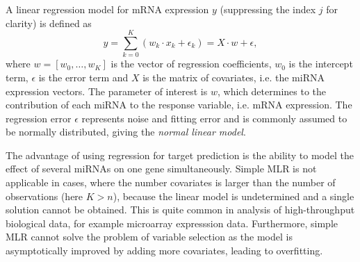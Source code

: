 A linear regression model for mRNA expression $y$ (suppressing the index $j$ for clarity) is defined as
\begin{equation}
  \label{eq:linear-regression}
	y = \sum_{k=0}^{K} (w_{k} \cdot x_k + \epsilon_{k}) =  X \cdot w + \epsilon,
\end{equation}
where $w = [w_0, \ldots, w_K]$ is the vector of regression coefficients,
$w_0$ is the intercept term, $\epsilon$ is the error term and $X$ is the
matrix of covariates, i.e. the miRNA expression vectors. The parameter of
interest is $w$, which determines to the contribution of each miRNA to the
response variable, i.e. mRNA expression. The regression error $\epsilon$
represents noise and fitting error and is commonly assumed to be normally
distributed, giving the \emph{normal linear model}.

The advantage of using regression for target prediction is the ability to
model the effect of several miRNAs on one gene simultaneously.
Simple MLR is not applicable in cases, where the number covariates is larger
than the number of observations (here $K > n$), because the linear model is
undetermined and a single solution cannot be obtained. This is quite common
in analysis of high-throughput biological data, for example microarray
expresssion data. Furthermore, simple MLR cannot solve the problem of
variable selection as the model is asymptotically
improved by adding more covariates, leading to overfitting.

